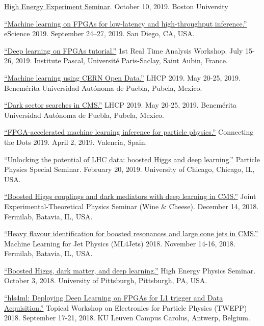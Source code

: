 \documentclass[12pt]{res}
\begin{document}
\begin{resume}
\href{http://physics.bu.edu/events/show/2204}{High Energy Experiment Seminar}. October 10, 2019. Boston University

\href{https://escience2019.sdsc.edu/program}{``Machine
  learning on FPGAs for low-latency and high-throughput inference.''}
eScience 2019. September 24–27, 2019. San Diego, CA, USA.

\href{https://indico.cern.ch/event/793125/contributions/3495251/}{``Deep learning on FPGAs tutorial.''} 1st Real Time Analysis Workshop. July 15-26, 2019. Institute Pascal, Universit\'{e} Paris-Saclay, Saint Aubin, France.

\href{https://indico.cern.ch/event/687651/contributions/3428206/}{``Machine
  learning using CERN Open Data.''} LHCP 2019. May
  20-25, 2019. Benem\'{e}rita Universidad Aut\'{o}noma de Puebla, Pubela, Mexico.

\href{https://indico.cern.ch/event/687651/contributions/3426898/}{``Dark
  sector searches in CMS.''} LHCP 2019. May
  20-25, 2019. Benem\'{e}rita Universidad Aut\'{o}noma de Puebla, Pubela, Mexico.

\href{https://indico.cern.ch/event/742793/contributions/3274392/}{``FPGA-accelerated
  machine learning inference for particle physics.''} Connecting the
Dots 2019. April 2, 2019. Valencia, Spain.

\href{https://universityofchicago.hosted.panopto.com/Panopto/Pages/Viewer.aspx?id=66ca09d7-74c1-4b12-bb57-a9fa01046cdf}{``Unlocking
  the potential of LHC data: boosted Higgs and deep learning.''}
Particle Physics Special Seminar. February 20, 2019. University of Chicago, Chicago, IL, USA.

\href{http://theory.fnal.gov/events/event/results-from-cms-18/}{``Boosted
  Higgs couplings and dark mediators with deep learning in CMS.''}
Joint Experimental-Theoretical Physics Seminar (Wine \& Cheese). December 14, 2018. Fermilab, Batavia, IL, USA.

\href{https://indico.cern.ch/event/745718/contributions/3211982/}{``Heavy
  flavour identification for boosted resonances and large cone jets in
  CMS.''} Machine Learning for Jet Physics (ML4Jets) 2018. November
14-16, 2018. Fermilab, Batavia, IL, USA.

\href{https://www.physicsandastronomy.pitt.edu/events/hep-seminar-javier-duarte-fermilab}{``Boosted
    Higgs, dark matter, and deep learning.''} High Energy Physics
  Seminar. October 3, 2018. University of Pittsburgh, Pittsburgh, PA, USA.

\href{https://indico.cern.ch/event/697988/contributions/3055990/}{``hls4ml:
    Deploying Deep Learning on FPGAs for L1 trigger and Data
    Acquisition.''} Topical Workshop on Electronics for
  Particle Physics (TWEPP) 2018. September 17-21, 2018. KU Leuven Campus Carolus, Antwerp, Belgium.


\end{resume}
\end{document}
